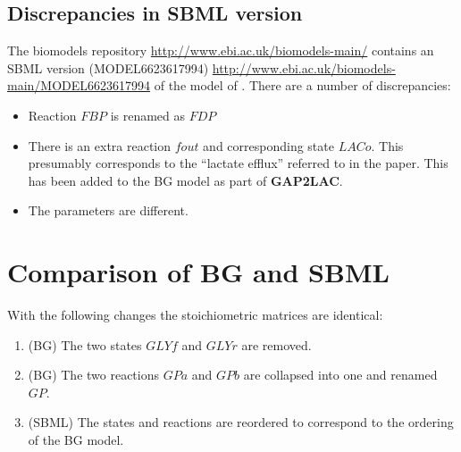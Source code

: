 \message{ !name(LamKus02_report.tex)}\documentclass[12pt,a4paper]{article}
\begin{document}
\subsection{Discrepancies in SBML version}
\label{sec:discr-sbml-vers}
The biomodels repository \url{http://www.ebi.ac.uk/biomodels-main/}
contains an SBML version (MODEL6623617994)
\url{http://www.ebi.ac.uk/biomodels-main/MODEL6623617994} of the model
of \citet{LamKus02}. There are a number of discrepancies:
\begin{itemize}
\item Reaction $FBP$ is renamed as $FDP$
\item There is an extra reaction $fout$ and corresponding state
  $LACo$. This presumably corresponds to the ``lactate efflux''
  referred to in the paper. This has been added to the BG model as
  part of \textbf{GAP2LAC}.
\item The parameters are different.
\end{itemize}

\section{Comparison of BG and SBML}
With the following changes the stoichiometric matrices are identical:
\begin{enumerate}
\item (BG) The two states $GLYf$ and $GLYr$ are removed.
\item (BG) The two reactions $GPa$ and $GPb$ are collapsed into one and
  renamed $GP$.
\item (SBML) The states and reactions are reordered to correspond to
  the ordering of the BG model.
\end{enumerate}


\end{document}
